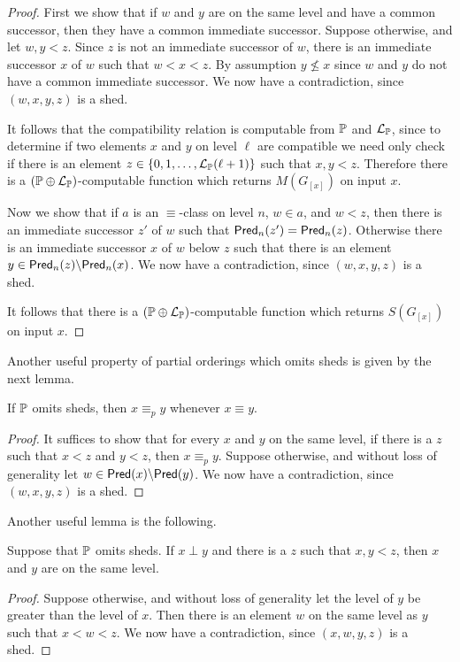 \begin{proof}
First we show that if $w$ and $y$ are on the same level
and have a common successor, then they have a common immediate successor.
Suppose otherwise, and let $w,y< z$.
Since $z$ is not an immediate successor of $w$,
there is an immediate successor $x$ of $w$ such that $w< x< z$.
By assumption $y\not\leq x$ since $w$ and $y$ do not
have a common immediate successor.
We now have a contradiction, since $(w,x,y,z)$ is a shed.

It follows that the compatibility relation is computable
from $\mathbb{P}$ and $\mathcal{L}_{\mathbb{P}}$, since to determine
if two elements $x$ and $y$ on level $\ell$ are compatible
we need only check if there is an element
$z\in\{0,1,\ldots,\mathcal{L}_{\mathbb{P}}(\ell+1)\}$ such that $x,y<z$.
Therefore there is a $(\mathbb{P}\oplus\mathcal{L}_{\mathbb{P}})$-computable function
which returns $M(G_{[x]})$ on input $x$.

Now we show that if $a$ is an $\equiv$-class on level $n$,
$w\in a$, and $w< z$, then there is an immediate successor
$z'$ of $w$ such that $\mathsf{Pred}_n(z')=\mathsf{Pred}_n(z)$.
Otherwise there is an immediate successor $x$ of $w$ below $z$
such that there is an element $y\in\mathsf{Pred}_n(z)\backslash\mathsf{Pred}_n(x)$.
We now have a contradiction, since $(w,x,y,z)$ is a shed.

It follows that there is a $(\mathbb{P}\oplus\mathcal{L}_{\mathbb{P}})$-computable function
which returns $S(G_{[x]})$ on input $x$.
\end{proof}

Another useful property of partial orderings
which omits sheds is given by the next lemma.

\begin{lem}[\RCAo]\label{L:shedAvoidingThinsEquivp}
If $\mathbb{P}$ omits sheds, then $x\equiv_p y$ whenever $x\equiv y$.
\end{lem}
\begin{proof}
It suffices to show that for every $x$ and $y$ on the same level,
if there is a $z$ such that $x< z$ and $y< z$, then $x\equiv_p y$.
Suppose otherwise, and without loss of generality
let $w\in\mathsf{Pred}(x)\backslash\mathsf{Pred}(y)$.
We now have a contradiction, since $(w,x,y,z)$ is a shed.
\end{proof}

Another useful lemma is the following.

\begin{lem}[\RCAo]\label{L:shedAvoidinglevLem}
Suppose that $\mathbb{P}$ omits sheds.
If $x\perp y$ and there is a $z$ such that $x,y<z$,
then $x$ and $y$ are on the same level.
\end{lem}
\begin{proof}
Suppose otherwise, and without loss of generality
let the level of $y$ be greater than the level of $x$.
Then there is an element $w$ on the same level as $y$
such that $x<w<z$.
We now have a contradiction, since $(x,w,y,z)$ is a shed.
\end{proof}

